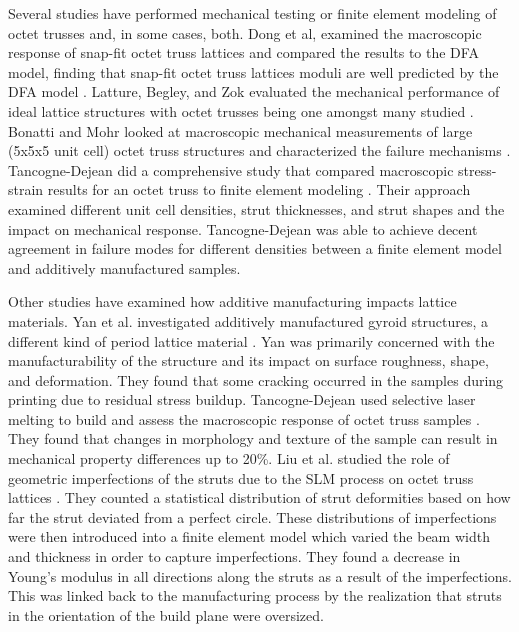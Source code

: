 Several studies have performed mechanical testing or finite element modeling of octet trusses and, in some cases, both. Dong et al, examined the macroscopic response of snap-fit octet truss lattices and compared the results to the DFA model, finding that snap-fit octet truss lattices moduli are well predicted by the DFA model \cite{Dong2015}. Latture, Begley, and Zok evaluated the mechanical performance of ideal lattice structures with octet trusses being one amongst many studied \cite{Latture2017}. Bonatti and Mohr looked at macroscopic mechanical measurements of large (5x5x5 unit cell) octet truss structures and characterized the failure mechanisms \cite{Bonatti2017}. Tancogne-Dejean did a comprehensive study that compared macroscopic stress-strain results for an octet truss to finite element modeling \cite{Tancogne-Dejean2016}. Their approach examined different unit cell densities, strut thicknesses, and strut shapes and the impact on mechanical response. Tancogne-Dejean was able to achieve decent agreement in failure modes for different densities between a finite element model and additively manufactured samples. 

Other studies have examined how additive manufacturing impacts lattice materials. Yan et al. investigated additively manufactured gyroid structures, a different kind of period lattice material \cite{Yan2012}. Yan was primarily concerned with the manufacturability of the structure and its impact on surface roughness, shape, and deformation. They found that some cracking occurred in the samples during printing due to residual stress buildup. Tancogne-Dejean used selective laser melting to build and assess the macroscopic response of octet truss samples \cite{Tancogne-Dejean2016}. They found that changes in morphology and texture of the sample can result in mechanical property differences up to 20\%. Liu et al. studied the role of geometric imperfections of the struts due to the SLM process on octet truss lattices \cite{Liu2017}. They counted a statistical distribution of strut deformities based on how far the strut deviated from a perfect circle. These distributions of imperfections were then introduced into a finite element model which varied the beam width and thickness in order to capture imperfections. They found a decrease in Young's modulus in all directions along the struts as a result of the imperfections. This was linked back to the manufacturing process by the realization that struts in the orientation of the build plane were oversized.

